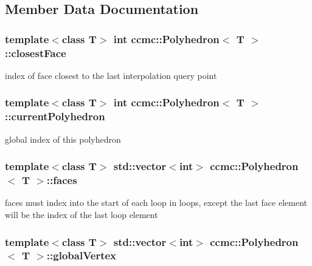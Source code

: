 \subsection{Member Data Documentation}
\hypertarget{classccmc_1_1_polyhedron_a50889e065612d1cd397cd7942349bb7b}{
\subsubsection[{closest\-Face}]{\setlength{\rightskip}{0pt plus 5cm}template$<$class T$>$ int {\bf ccmc\-::\-Polyhedron}$<$ T $>$\-::closest\-Face}}\label{classccmc_1_1_polyhedron_a50889e065612d1cd397cd7942349bb7b}
index of face closest to the last interpolation query point \hypertarget{classccmc_1_1_polyhedron_af684c14a5bfee6f3e29cdd1879da8aba}{
\subsubsection[{current\-Polyhedron}]{\setlength{\rightskip}{0pt plus 5cm}template$<$class T$>$ int {\bf ccmc\-::\-Polyhedron}$<$ T $>$\-::current\-Polyhedron}}\label{classccmc_1_1_polyhedron_af684c14a5bfee6f3e29cdd1879da8aba}
global index of this polyhedron \hypertarget{classccmc_1_1_polyhedron_a85b5d967346fc1fd362b22bd0359cc4e}{
\subsubsection[{faces}]{\setlength{\rightskip}{0pt plus 5cm}template$<$class T$>$ std\-::vector$<$int$>$ {\bf ccmc\-::\-Polyhedron}$<$ T $>$\-::faces}}\label{classccmc_1_1_polyhedron_a85b5d967346fc1fd362b22bd0359cc4e}
faces must index into the start of each loop in loops, except the last face element will be the index of the last loop element \hypertarget{classccmc_1_1_polyhedron_aa16a2a05fcbafa0c99fc6b5de21672cc}{
\subsubsection[{global\-Vertex}]{\setlength{\rightskip}{0pt plus 5cm}template$<$class T$>$ std\-::vector$<$int$>$ {\bf ccmc\-::\-Polyhedron}$<$ T $>$\-::global\-Vertex}}\label{classccmc_1_1_polyhedron_aa16a2a05fcbafa0c99fc6b5de21672cc}
